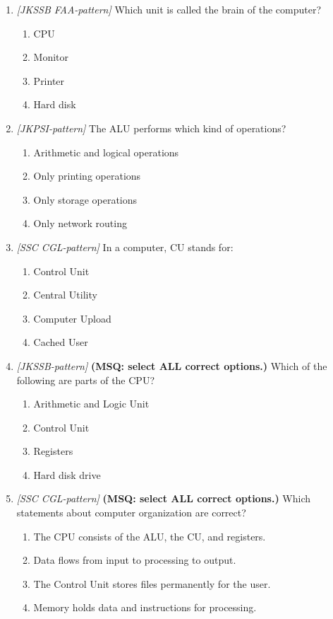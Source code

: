 \documentclass[11pt]{article}
\begin{document}
\begin{enumerate}[label=\textbf{Q\arabic*.}, leftmargin=*]
\item \textit{[JKSSB FAA-pattern]} Which unit is called the brain of the computer?
  \begin{enumerate}[label=\Alph*.]
    \item CPU
    \item Monitor
    \item Printer
    \item Hard disk
  \end{enumerate}
\item \textit{[JKPSI-pattern]} The ALU performs which kind of operations?
  \begin{enumerate}[label=\Alph*.]
    \item Arithmetic and logical operations
    \item Only printing operations
    \item Only storage operations
    \item Only network routing
  \end{enumerate}
\item \textit{[SSC CGL-pattern]} In a computer, CU stands for:
  \begin{enumerate}[label=\Alph*.]
    \item Control Unit
    \item Central Utility
    \item Computer Upload
    \item Cached User
  \end{enumerate}
\item \textit{[JKSSB-pattern]} \textbf{(MSQ: select ALL correct options.)} Which of the following are parts of the CPU?
  \begin{enumerate}[label=\Alph*.]
    \item Arithmetic and Logic Unit
    \item Control Unit
    \item Registers
    \item Hard disk drive
  \end{enumerate}
\item \textit{[SSC CGL-pattern]} \textbf{(MSQ: select ALL correct options.)} Which statements about computer organization are correct?
  \begin{enumerate}[label=\Alph*.]
    \item The CPU consists of the ALU, the CU, and registers.
    \item Data flows from input to processing to output.
    \item The Control Unit stores files permanently for the user.
    \item Memory holds data and instructions for processing.
  \end{enumerate}
\end{enumerate}
\def\JKSSBLessonID{4}\def\JKSSBAnswers{0}
\end{document}
